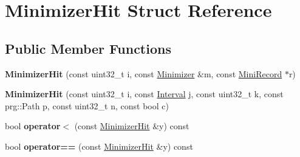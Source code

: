 \hypertarget{structMinimizerHit}{}\section{Minimizer\+Hit Struct Reference}
\label{structMinimizerHit}
\subsection*{Public Member Functions}
\begin{DoxyCompactItemize}
\item 
\mbox{\label{structMinimizerHit_a33d7f08088357743c067a95ca37625a9}} 
{\bfseries Minimizer\+Hit} (const uint32\+\_\+t i, const \hyperlink{structMinimizer}{Minimizer} \&m, const \hyperlink{structMiniRecord}{Mini\+Record} $\ast$r)
\item 
\mbox{\label{structMinimizerHit_acdb79c266210dfaaa2dce35f2097b9fc}} 
{\bfseries Minimizer\+Hit} (const uint32\+\_\+t i, const \hyperlink{structInterval}{Interval} j, const uint32\+\_\+t k, const prg\+::\+Path p, const uint32\+\_\+t n, const bool c)
\item 
\mbox{\label{structMinimizerHit_af1a85716a5696e7ca0d9cc27ef321446}} 
bool {\bfseries operator$<$} (const \hyperlink{structMinimizerHit}{Minimizer\+Hit} \&y) const
\item 
\mbox{\label{structMinimizerHit_ac06296d203dc8cdde9dcd4733be524b5}} 
bool {\bfseries operator==} (const \hyperlink{structMinimizerHit}{Minimizer\+Hit} \&y) const
\end{DoxyCompactItemize}
